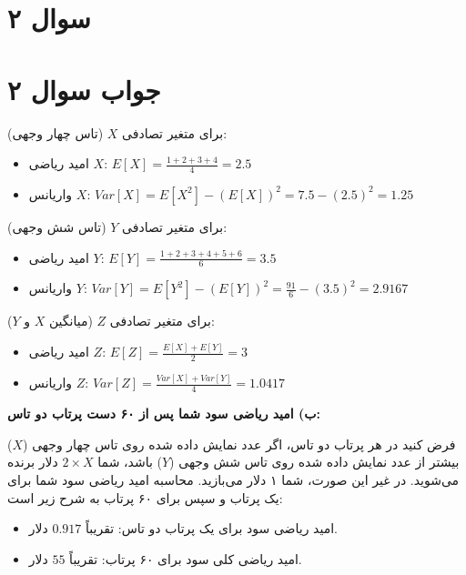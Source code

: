 \section*{سوال ۲}



\section*{جواب سوال ۲}

برای متغیر تصادفی \(X\) (تاس چهار وجهی):
\begin{itemize}
	\item امید ریاضی \(X\): \(E[X] = \frac{1 + 2 + 3 + 4}{4} = 2.5\)
	\item واریانس \(X\): \(Var[X] = E[X^2] - (E[X])^2 = 7.5 - (2.5)^2 = 1.25\)
\end{itemize}

برای متغیر تصادفی \(Y\) (تاس شش وجهی):
\begin{itemize}
	\item امید ریاضی \(Y\): \(E[Y] = \frac{1 + 2 + 3 + 4 + 5 + 6}{6} = 3.5\)
	\item واریانس \(Y\): \(Var[Y] = E[Y^2] - (E[Y])^2 = \frac{91}{6} - (3.5)^2 = 2.9167\)
\end{itemize}

برای متغیر تصادفی \(Z\) (میانگین \(X\) و \(Y\)):
\begin{itemize}
	\item امید ریاضی \(Z\): \(E[Z] = \frac{E[X] + E[Y]}{2} = 3\)
	\item واریانس \(Z\): \(Var[Z] = \frac{Var[X] + Var[Y]}{4} = 1.0417\)
\end{itemize}

\textbf{ب) امید ریاضی سود شما پس از ۶۰ دست پرتاب دو تاس:}

فرض کنید در هر پرتاب دو تاس، اگر عدد نمایش داده شده روی تاس چهار وجهی (\(X\)) بیشتر از عدد نمایش داده شده روی تاس شش وجهی (\(Y\)) باشد، شما \(2 \times X\) دلار برنده می‌شوید. در غیر این صورت، شما ۱ دلار می‌بازید. محاسبه امید ریاضی سود شما برای یک پرتاب و سپس برای ۶۰ پرتاب به شرح زیر است:

\begin{itemize}
	\item امید ریاضی سود برای یک پرتاب دو تاس: تقریباً \(0.917\) دلار.
	\item امید ریاضی کلی سود برای ۶۰ پرتاب: تقریباً \(55\) دلار.
\end{itemize}